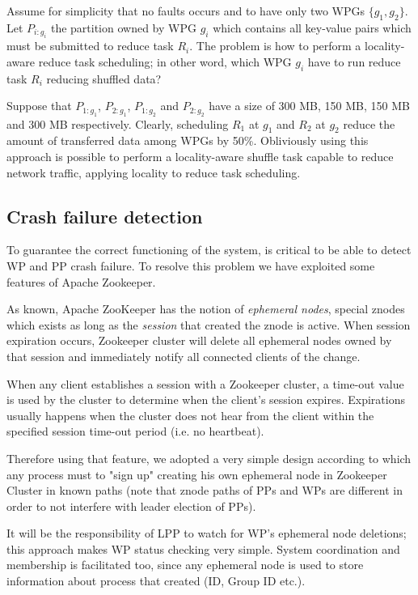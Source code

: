 \documentclass[sigchi]{acmart}
\begin{document}
Assume for simplicity that no faults occurs and to have only two WPGs $\lbrace g_1, g_2 \rbrace$. Let $P_{i:g_i}$ the partition owned by WPG $g_i$ which contains all key-value pairs which must be submitted to reduce task $R_i$. The problem is how to perform a locality-aware reduce task scheduling; in other word, which WPG $g_i$ have to run reduce task $R_i$ reducing shuffled data?

Suppose that $P_{1:g_1}$, $P_{2:g_1}$, $P_{1:g_2}$ and $P_{2:g_2}$ have a size of 300 MB, 150 MB, 150 MB and 300 MB respectively. Clearly, scheduling $R_1$ at $g_1$ and $R_2$ at $g_2$ reduce the amount of transferred data among WPGs by 50\%. Obliviously using this approach is possible to perform a locality-aware shuffle task capable to reduce network traffic, applying locality to reduce task scheduling.  

\subsection{Crash failure detection} To guarantee the correct functioning of the system, is critical to be able to detect WP and PP crash failure. To resolve this problem we have exploited some features of Apache Zookeeper. 

As known, Apache ZooKeeper has the notion of \textit{ephemeral nodes}, special znodes which exists as long as the \textit{session} that created the znode is active. When session expiration occurs, Zookeeper cluster will delete all ephemeral nodes owned by that session and immediately notify all connected clients of the change.

When any client establishes a session with a Zookeeper cluster, a time-out value is used by the cluster to determine when the client's session expires. Expirations usually happens when the cluster does not hear from the client within the specified session time-out period (i.e. no heartbeat).

Therefore using that feature, we adopted a very simple design according to which any process must to "sign up" creating his own ephemeral node in Zookeeper Cluster in known paths (note that znode paths of PPs and WPs are different in order to not interfere with leader election of PPs). 

It will be the responsibility of LPP to watch for WP's ephemeral node deletions; this approach makes WP status checking very simple. System coordination and membership is facilitated too, since any ephemeral node is used to store information about process that created (ID, Group ID etc.).
\end{document}
